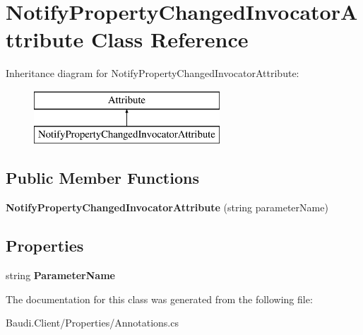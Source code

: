 \hypertarget{class_notify_property_changed_invocator_attribute}{}\section{Notify\+Property\+Changed\+Invocator\+Attribute Class Reference}
\label{class_notify_property_changed_invocator_attribute}
Inheritance diagram for Notify\+Property\+Changed\+Invocator\+Attribute\+:\begin{figure}[H]
\begin{center}
\leavevmode
\includegraphics[height=2.000000cm]{class_notify_property_changed_invocator_attribute}
\end{center}
\end{figure}
\subsection*{Public Member Functions}
\begin{DoxyCompactItemize}
\item 
\hypertarget{class_notify_property_changed_invocator_attribute_a53ea804fe542cdfff5c0ffbb47fdaeb0}{}{\bfseries Notify\+Property\+Changed\+Invocator\+Attribute} (string parameter\+Name)\label{class_notify_property_changed_invocator_attribute_a53ea804fe542cdfff5c0ffbb47fdaeb0}

\end{DoxyCompactItemize}
\subsection*{Properties}
\begin{DoxyCompactItemize}
\item 
\hypertarget{class_notify_property_changed_invocator_attribute_a156a54b467974741191e07b4812442ac}{}string {\bfseries Parameter\+Name}\label{class_notify_property_changed_invocator_attribute_a156a54b467974741191e07b4812442ac}

\end{DoxyCompactItemize}


The documentation for this class was generated from the following file\+:\begin{DoxyCompactItemize}
\item 
Baudi.\+Client/\+Properties/Annotations.\+cs\end{DoxyCompactItemize}
